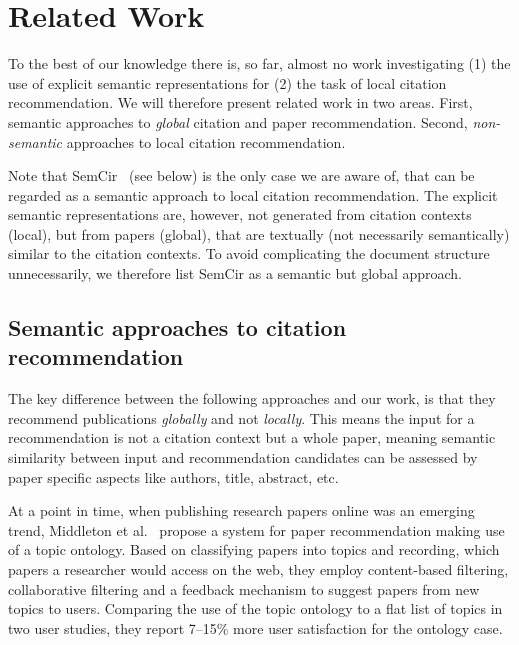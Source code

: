 \chapter{Related Work}\label{chap:relatedwork}

To the best of our knowledge there is, so far, almost no work investigating (1) the use of explicit semantic representations for (2) the task of local citation recommendation. We will therefore present related work in two areas. First, semantic approaches to \emph{global} citation and paper recommendation. Second, \emph{non-semantic} approaches to local citation recommendation.

Note that SemCir~\cite{Zarrinkalam2013} (see below) is the only case we are aware of, that can be regarded as a semantic approach to local citation recommendation. The explicit semantic representations are, however, not generated from citation contexts (local), but from papers (global), that are textually (not necessarily semantically) similar to the citation contexts. To avoid complicating the document structure unnecessarily, we therefore list SemCir as a semantic but global approach.

\section{Semantic approaches to citation recommendation}

The key difference between the following approaches and our work, is that they recommend publications \emph{globally} and not \emph{locally}. This means the input for a recommendation is not a citation context but a whole paper, meaning semantic similarity between input and recommendation candidates can be assessed by paper specific aspects like authors, title, abstract, etc.

At a point in time, when publishing research papers online was an emerging trend, Middleton et al.~\cite{Middleton2001} propose a system for paper recommendation making use of a topic ontology. Based on classifying papers into topics and recording, which papers a researcher would access on the web, they employ content-based filtering, collaborative filtering and a feedback mechanism to suggest papers from new topics to users. Comparing the use of the topic ontology to a flat list of topics in two user studies, they report 7--15\% more user satisfaction for the ontology case.

